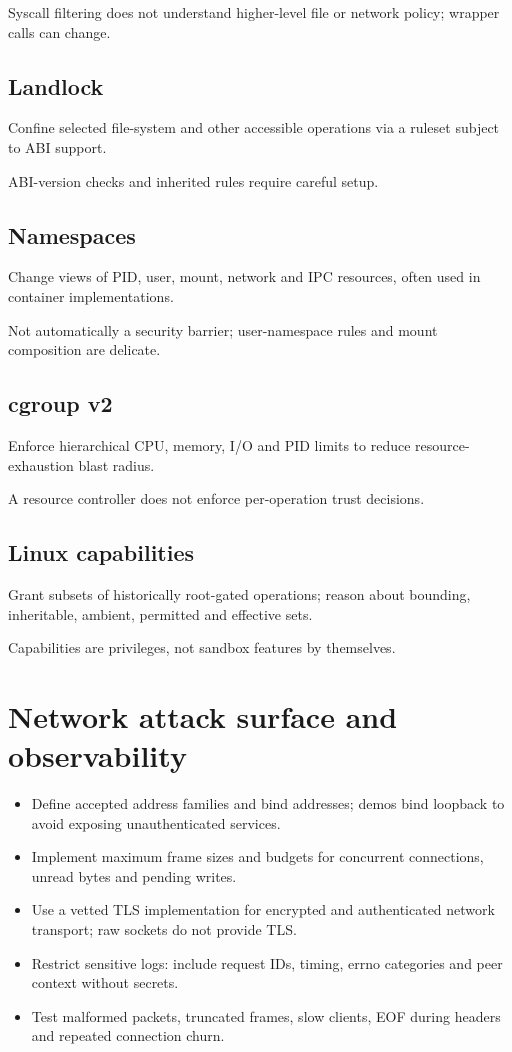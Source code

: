 \documentclass[11pt,letterpaper,oneside]{report}
\begin{document}
\begin{modernnote}
Syscall filtering does not understand higher-level file or network policy; wrapper calls can change.
\end{modernnote}
\section{Landlock}
Confine selected file-system and other accessible operations via a ruleset subject to ABI support.

\begin{modernnote}
ABI-version checks and inherited rules require careful setup.
\end{modernnote}
\section{Namespaces}
Change views of PID, user, mount, network and IPC resources, often used in container implementations.

\begin{modernnote}
Not automatically a security barrier; user-namespace rules and mount composition are delicate.
\end{modernnote}
\section{cgroup v2}
Enforce hierarchical CPU, memory, I/O and PID limits to reduce resource-exhaustion blast radius.

\begin{modernnote}
A resource controller does not enforce per-operation trust decisions.
\end{modernnote}
\section{Linux capabilities}
Grant subsets of historically root-gated operations; reason about bounding, inheritable, ambient, permitted and effective sets.

\begin{modernnote}
Capabilities are privileges, not sandbox features by themselves.
\end{modernnote}
\chapter{Network attack surface and observability}
\begin{itemize}
\item Define accepted address families and bind addresses; demos bind loopback to avoid exposing unauthenticated services.
\item Implement maximum frame sizes and budgets for concurrent connections, unread bytes and pending writes.
\item Use a vetted TLS implementation for encrypted and authenticated network transport; raw sockets do not provide TLS.
\item Restrict sensitive logs: include request IDs, timing, errno categories and peer context without secrets.
\item Test malformed packets, truncated frames, slow clients, EOF during headers and repeated connection churn.
\end{itemize}
\end{document}
